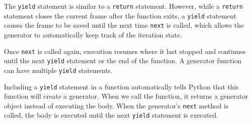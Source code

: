 The \lstinline$yield$ statement is similar to a \lstinline$return$ statement.
However, while a \lstinline$return$ statement closes the current frame after the
function exits, a \lstinline$yield$ statement causes the frame to be saved until
the next time \lstinline$next$ is called, which allows the generator to
automatically keep track of the iteration state.

Once \lstinline$next$ is called again, execution resumes where it last
stopped and continues until the next \lstinline$yield$ statement or the end of
the function. A generator function can have multiple \lstinline$yield$
statements.

Including a \lstinline$yield$ statement in a function automatically tells Python
that this function will create a generator. When we call the function, it
returns a generator object instead of executing the body.  When the
generator's \lstinline$next$ method is called, the body is executed until
the next \lstinline$yield$ statement is executed.

